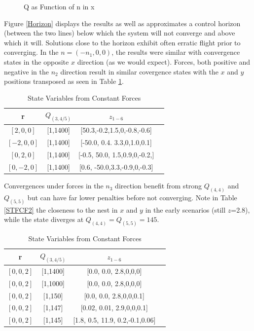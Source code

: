 \documentclass{article}
\begin{document}
\begin{multicols}{2}
\begin{figure}[H]
     \label{fig:Horizon}
     \caption{Q as Function of n in x}
\end{figure}
Figure \ref{Horizon} displays the results as well as approximates a control horizon (between the two lines) below which the system will not converge and above which it will.  Solutions close to the horizon exhibit often erratic flight prior to converging.  In the $n=(-n_1,0,0)$, the results were similar with convergence states in the opposite $x$ direction (as we would expect).  Forces, both positive and negative in the $n_2$ direction result in similar covergence states with the $x$ and $y$ positions transposed as seen in Table \ref{tab:STFCF1}.\\

\begin{table}[H] %
\begin{centering}
\begin{tabular}{|cccc|}
\hline
r & $Q_{(3,4/5)}$ & $z_{1-6}$   \\
\hline
 $[2,0,0]$&[1,1400]&[50.3,-0.2,1.5,0,-0.8,-0.6]\\
 $[-2,0,0]$&[1,1400]&[-50.0, 0.4. 3.3,0,1.0,0.1]\\
 $[0,2,0]$&[1,1400]&[-0.5, 50.0, 1.5,0.9,0,-0.2,]\\
 $[0,-2,0]$&[1,1400]&[0.6, -50.0,3.3,-0.9,0,-0.3]\\ 
\hline
\end{tabular}
\caption{State Variables from Constant Forces}
\label{tab:STFCF1}
\end{centering}
\end{table}

Convergences under forces in the $n_3$ direction benefit from strong $Q_{(4,4)}$ and $Q_{(5,5)}$ but can have far lower penalties before not converging.  Note in Table \ref{STFCF2} the closeness to the nest in $x$ and $y$ in the early scenarios (still $z$=2.8), while the state diverges at $Q_{(4,4)}=Q_{(5,5)}=145$.
\begin{table}[H] %
\begin{centering}
\begin{tabular}{|cccc|}
\hline
r & $Q_{(3,4/5)}$ & $z_{1-6}$   \\
\hline
 $[0,0,2]$&[1,1400]&[0.0, 0.0, 2.8,0,0,0]\\
 $[0,0,2]$&[1,1000]&[0.0, 0.0, 2.8,0,0,0]\\
$[0,0,2]$&[1,150]&[0.0, 0.0, 2.8,0,0,0.1]\\
$[0,0,2]$&[1,147]&[0.02, 0.01, 2.9,0,0,0.1]\\
$[0,0,2]$&[1,145]&[1.8, 0.5, 11.9, 0.2,-0.1,0.06]\\
 \hline
\end{tabular}
\caption{State Variables from Constant Forces}
\label{tab:STFCF2}
\end{centering}
\end{table}


\end{multicols}
\end{document}
